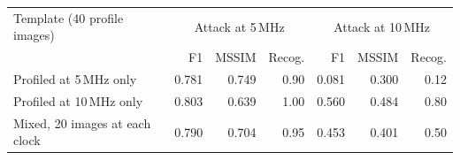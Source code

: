 \begin{tabular}{lrrrrrr}
\hline
Template (40 profile images) & \multicolumn{3}{c}{Attack at 5\,MHz} & \multicolumn{3}{c}{Attack at 10\,MHz} \\
 & F1 & MSSIM & Recog. & F1 & MSSIM & Recog. \\
\hline
Profiled at 5\,MHz only & 0.781 & 0.749 & 0.90 & 0.081 & 0.300 & 0.12 \\
Profiled at 10\,MHz only & 0.803 & 0.639 & 1.00 & 0.560 & 0.484 & 0.80 \\
Mixed, 20 images at each clock & 0.790 & 0.704 & 0.95 & 0.453 & 0.401 & 0.50 \\
\hline
\end{tabular}
